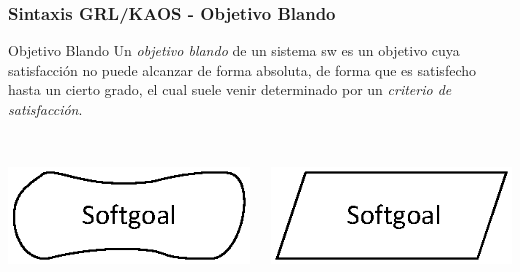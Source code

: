 \documentclass[slidestop,xcolor=pst,dvips,blue]{beamer}
\begin{document}
\begin{frame}[c]
    \frametitle{Sintaxis GRL/KAOS - Objetivo Blando}
    \begin{block}{Objetivo Blando}
        Un \alert{\emph{objetivo blando}} de un sistema sw es un objetivo cuya satisfacción no puede alcanzar de forma absoluta, de forma que es satisfecho hasta un cierto grado, el cual suele venir determinado por un \emph{criterio de satisfacción}.
        \ \\
        \ \\
        \begin{columns}[c]
            \begin{column}{0.50\linewidth}
                \centering \includegraphics[width=0.5\columnwidth,keepaspectratio=true]{images/objetivos/softgoal(GRL).eps}
            \end{column}
            \begin{column}{0.50\linewidth}
                \centering \includegraphics[width=0.5\columnwidth,keepaspectratio=true]{images/objetivos/softgoal(KAOS).eps}
            \end{column}
        \end{columns}
    \end{block}
\end{frame}
\end{document}
